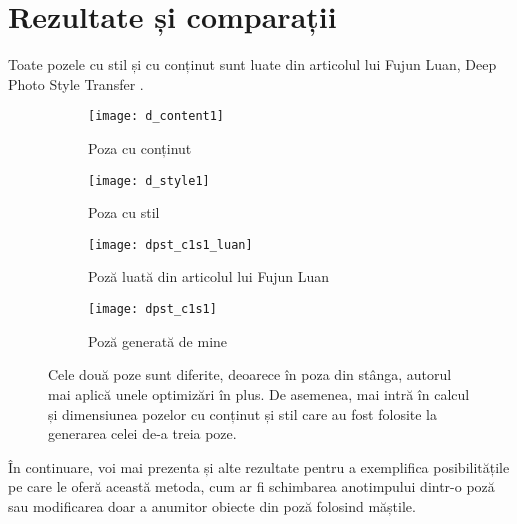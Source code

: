 \section{Rezultate și comparații}
Toate pozele cu stil și cu conținut sunt luate din articolul lui Fujun Luan, Deep Photo Style Transfer \cite{luan2017}.
\begin{figure}[h]
	\centering
    \begin{subfigure}[b]{0.49\textwidth}
		\centering
        \texttt{[image: d\_content1]}
        \label{fig:dpst_d_content1}
        \caption{Poza cu conținut}
	\end{subfigure}
    \hfill
    \begin{subfigure}[b]{0.49\textwidth}
		\centering
        \texttt{[image: d\_style1]}
        \label{fig:dpst_d_style1}
        \caption{Poza cu stil}
	\end{subfigure}
    \begin{subfigure}[b]{0.49\textwidth}
		\centering
        \texttt{[image: dpst\_c1s1\_luan]}
        \label{fig:dpst_c1s1_luan}
        \caption{Poză luată din articolul lui Fujun Luan}
	\end{subfigure}
    \hfill
    \begin{subfigure}[b]{0.49\textwidth}
		\centering
        \texttt{[image: dpst\_c1s1]}
        \label{fig:dpst_c1s1}
        \caption{Poză generată de mine}
	\end{subfigure}
    \caption{Cele două poze sunt diferite, deoarece în poza din stânga, autorul mai aplică unele optimizări în plus. De asemenea, mai intră în calcul și dimensiunea pozelor cu conținut și stil care au fost folosite la generarea celei de-a treia poze.}
\end{figure}

În continuare, voi mai prezenta și alte rezultate pentru a exemplifica posibilitățile pe care le oferă această metoda, cum ar fi schimbarea anotimpului dintr-o poză sau modificarea doar a anumitor obiecte din poză folosind măștile.

